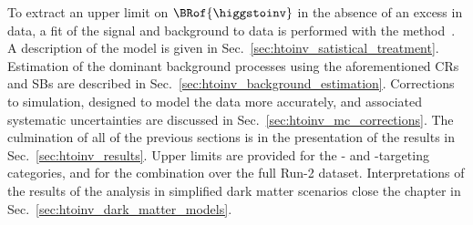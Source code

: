 To extract an upper limit on $\BRof{\higgstoinv}$ in the absence of an excess in data, a fit of the signal and background to data is performed with the \CLs method~\cite{Read_2002}. A description of the model is given in Sec.~\ref{sec:htoinv_satistical_treatment}. Estimation of the dominant background processes using the aforementioned \glspl{CR} and \glspl{SB} are described in Sec.~\ref{sec:htoinv_background_estimation}. Corrections to simulation, designed to model the data more accurately, and associated systematic uncertainties are discussed in Sec.~\ref{sec:htoinv_mc_corrections}. The culmination of all of the previous sections is in the presentation of the results in Sec.~\ref{sec:htoinv_results}. Upper limits are provided for the \ttH- and \VH-targeting categories, and for the combination over the full Run-2 dataset. Interpretations of the results of the analysis in simplified dark matter scenarios close the chapter in Sec.~\ref{sec:htoinv_dark_matter_models}.


